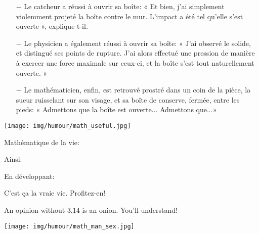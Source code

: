 	\begin{itemize}	 
		\item[$-$] Le catcheur a réussi à ouvrir sa boîte: « Et bien, j'ai simplement violemment projeté la boîte contre le mur. L'impact a été tel qu'elle s'est ouverte », explique t-il. 
	
		\item[$-$] Le physicien a également réussi à ouvrir sa boîte: « J'ai observé le solide, et distingué ses points de rupture. J'ai alors effectué une pression de manière à exercer une force maximale sur ceux-ci, et la boîte s'est tout naturellement ouverte. » 
	
		\item[$-$] Le mathématicien, enfin, est retrouvé prostré dans un coin de la pièce, la sueur ruisselant sur son visage, et sa boîte de conserve, fermée, entre les pieds: « Admettons que la boîte est ouverte... Admettons que...» 
	\end{itemize}
	\begin{center}\underline{\hspace{5 cm}}\end{center}
	\begin{center}
		\texttt{[image: img/humour/math\_useful.jpg]}	
	\end{center}

	\begin{center}\underline{\hspace{5 cm}}\end{center}
	Mathématique de la vie:
	
	Ainsi:
	
	En développant:
	
	C'est ça la vraie vie. Profitez-en!
	
	\begin{center}\underline{\hspace{5 cm}}\end{center}
	
	An opinion without $3.14$ is an onion. You'll understand!
	
	\begin{center}\underline{\hspace{5 cm}}\end{center}

	\begin{center}
		\texttt{[image: img/humour/math\_man\_sex.jpg]}	
	\end{center}
	
	\begin{center}\underline{\hspace{5 cm}}\end{center}
	
